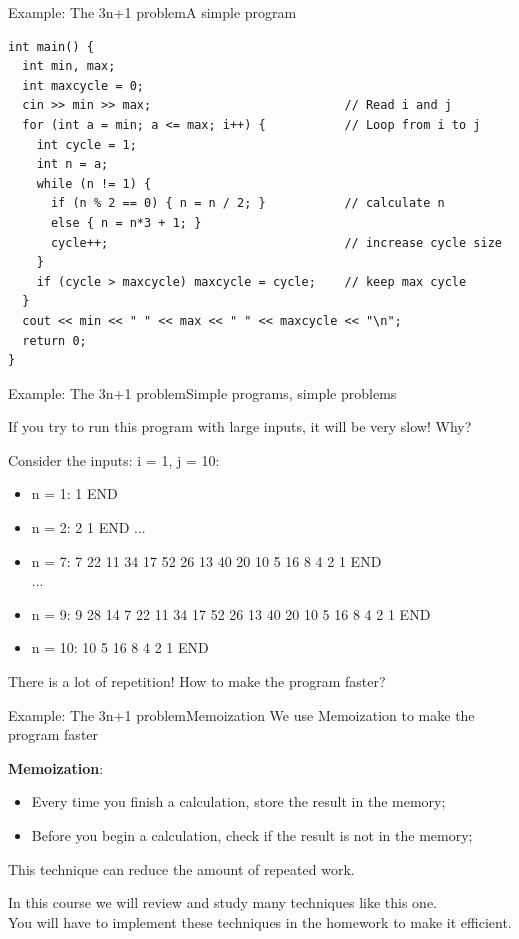 \begin{frame}[fragile]{Example: The 3n+1 problem}{A simple program}
{\smaller
\begin{verbatim}
int main() {
  int min, max;
  int maxcycle = 0;
  cin >> min >> max;                           // Read i and j
  for (int a = min; a <= max; i++) {           // Loop from i to j
    int cycle = 1;               
    int n = a;
    while (n != 1) {
      if (n % 2 == 0) { n = n / 2; }           // calculate n
      else { n = n*3 + 1; }
      cycle++;                                 // increase cycle size
    }
    if (cycle > maxcycle) maxcycle = cycle;    // keep max cycle
  }
  cout << min << " " << max << " " << maxcycle << "\n";
  return 0;
}
\end{verbatim}}
\end{frame}

\begin{frame}{Example: The 3n+1 problem}{Simple programs, simple
  problems}

If you try to run this program with large inputs, it will be very slow! Why?
\bigskip

Consider the inputs: i = 1, j = 10:
\begin{itemize}
  \item n = 1: 1 END
  \item n = 2: 2 1 END
  ...
  \item n = 7: 7 22 11 34 17 52 26 13 40 20 10 5 16 8 4 2 1 END\\
  ...
  \item n = 9: 9 28 14 \alert{7 22 11 34 17 52 26 13 40 20 10 5 16 8 4 2 1 END}
  \item n = 10: \alert{10 5 16 8 4 2 1 END}
\end{itemize}
\bigskip

There is a lot of repetition!  How to make the program faster?
\end{frame}

\begin{frame}{Example: The 3n+1 problem}{Memoization}
  We use \alert{Memoization} to make the program faster
  \bigskip

  {\bf Memoization}:
  \begin{itemize}
    \item Every time you finish a calculation, store the result in the memory;
    \item Before you begin a calculation, check if the result is not in the memory;
  \end{itemize}
  \bigskip

  This technique can reduce the amount of repeated work.
  \bigskip

  In this course we will review and study many techniques like this one.\\
  You will have to implement these techniques in the homework to make it efficient.
\end{frame}

